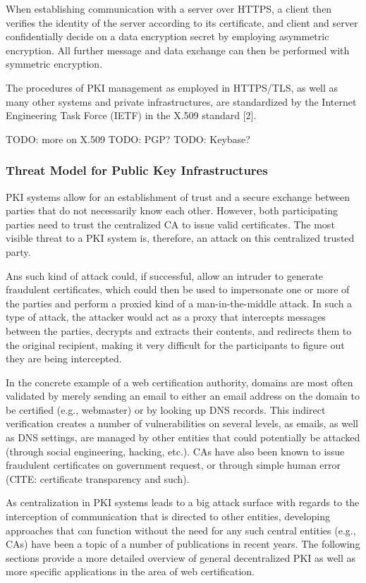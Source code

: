 When establishing communication with a server over HTTPS, a client then verifies the identity of the server according to its certificate, and client and server confidentially decide on a data encryption secret by employing asymmetric encryption. All further message and data exchange can then be performed with symmetric encryption.

The procedures of PKI management as employed in HTTPS/TLS, as well as many other systems and private infrastructures, are standardized by the Internet Engineering Task Force (IETF) in the X.509 standard [2].

TODO: more on X.509
TODO: PGP?
TODO: Keybase?


\subsubsection{Threat Model for Public Key Infrastructures}

PKI systems allow for an establishment of trust and a secure exchange between parties that do not necessarily know each other. However, both participating parties need to trust the centralized CA to issue valid certificates. The most visible threat to a PKI system is, therefore, an attack on this centralized trusted party.

Ans such kind of attack could, if successful, allow an intruder to generate fraudulent certificates, which could then be used to impersonate one or more of the parties and perform a proxied kind of a man-in-the-middle attack. In such a type of attack, the attacker would act as a proxy that intercepts messages between the parties, decrypts and extracts their contents, and redirects them to the original recipient, making it very difficult for the participants to figure out they are being intercepted.

In the concrete example of a web certification authority, domains are most often validated by merely sending an email to either an email address on the domain to be certified (e.g., webmaster) or by looking up DNS records. This indirect verification creates a number of vulnerabilities on several levels, as emails, as well as DNS settings, are managed by other entities that could potentially be attacked (through social engineering, hacking, etc.). CAs have also been known to issue fraudulent certificates on government request, or through simple human error (CITE: certificate transparency and such).

As centralization in PKI systems leads to a big attack surface with regards to the interception of communication that is directed to other entities, developing approaches that can function without the need for any such central entities (e.g., CAs) have been a topic of a number of publications in recent years. The following sections provide a more detailed overview of general decentralized PKI as well as more specific applications in the area of web certification.

